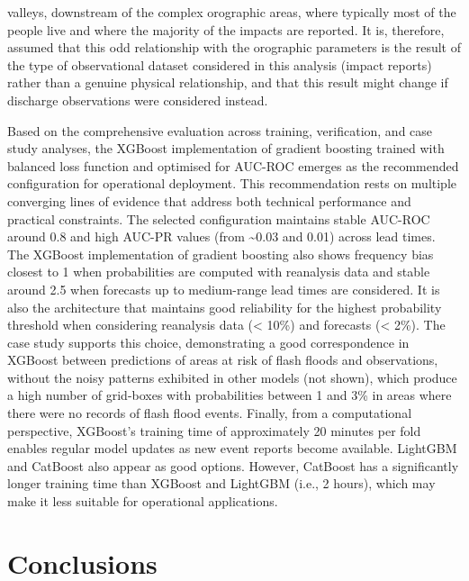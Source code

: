 valleys, downstream of the complex orographic areas, where typically most of the people live and where the majority of the impacts are reported. It is, therefore, assumed that this odd relationship with the orographic parameters is the result of the type of observational dataset considered in this analysis (impact reports) rather than a genuine physical relationship, and that this result might change if discharge observations were considered instead. 

Based  on the comprehensive evaluation across training, verification, and case study analyses, the XGBoost implementation of gradient boosting trained with balanced loss function and optimised for AUC-ROC emerges as the recommended configuration for operational deployment. This recommendation rests on multiple converging lines of evidence that address both technical performance and practical constraints. The selected configuration maintains stable AUC-ROC around 0.8 and high AUC-PR values (from \sim0.03 and 0.01) across lead times. The XGBoost implementation of gradient boosting also shows frequency bias closest to 1 when probabilities are computed with reanalysis data and stable around 2.5 when forecasts up to medium-range lead times are considered. It is also the architecture that maintains good reliability for the highest probability threshold when considering reanalysis data (< 10\%) and forecasts (< 2\%). The case study supports this choice, demonstrating a good correspondence in XGBoost between predictions of areas at risk of flash floods and observations, without the noisy patterns exhibited in other models (not shown), which produce a high number of grid-boxes with probabilities between 1 and 3\% in areas where there were no records of flash flood events. Finally, from a computational perspective, XGBoost's training time of approximately 20 minutes per fold enables regular model updates as new event reports become available. LightGBM and CatBoost also appear as good options. However, CatBoost has a significantly longer training time than XGBoost and LightGBM (i.e., 2 hours), which may make it less suitable for operational applications.


\section{Conclusions}
\label{data_driven_flash_floods_short_medium_range_conclusions}

